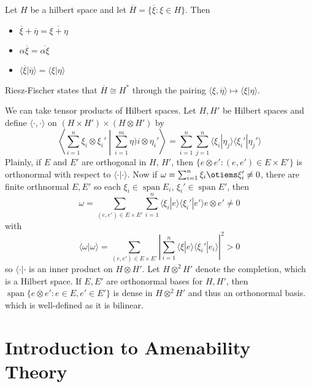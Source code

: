 \documentclass[11pt, a4paper]{memoir}
\newcommand{\ol}[1]{\ensuremath{\overline{#1}}}
\theoremstyle{change}
\theoremstyle{plain}
\theoremstyle{nonumberplain}
\DeclareMathOperator{\spn}{span}
\numberwithin{equation}{section}
\begin{document}
Let $H$ be a hilbert space and let $\overline{H}=\{\overline{\xi}:\xi\in H\}$.
Then
\begin{itemize}[nl]
    \item $\overline{\xi}+\overline{\eta}=\overline{\xi+\eta}$
    \item $\alpha\overline{\xi}=\overline{\alpha\xi}$
    \item $\langle\ol{\xi}|\ol{\eta}\rangle=\langle\xi|\eta\rangle$
\end{itemize}
Riesz-Fischer states that $\overline{H}\cong H^*$ through the pairing $\langle\xi,\overline{\eta}\rangle\mapsto\langle\xi|\eta\rangle$.

We can take tensor products of Hilbert spaces.
Let $H,H'$ be Hilbert spaces and define $\langle\cdot,\cdot\rangle$ on $(H\times H')\times(H\otimes H')$ by
\begin{equation*}
    \left\langle\sum_{i=1}^n\xi_i\otimes\xi_i'\middle|\sum_{i=1}^m\eta)i\otimes\eta_i'\right\rangle=\sum_{i=1}^n\sum_{j=1}^n\langle\xi_i|\eta_j\rangle\langle\xi_i'|\eta_j'\rangle
\end{equation*}
Plainly, if $E$ and $E'$ are orthogonal in $H$, $H'$, then $\{e\otimes e':(e,e')\in E\times E'\}$ is orthonormal with respect to $\langle\cdot|\cdot\rangle$.
Now if $\omega=\sum_{i=1}^n\xi_i\otiems\xi_i'\neq 0$, there are finite orthnormal $E,E'$ so each $\xi_i\in\spn E_i$, $\xi_i'\in\spn E'$, then
\begin{equation*}
    \omega=\sum_{(e,e')\in E\times E'}\sum_{i=1}^n\langle\xi_i|e\rangle\langle\xi_i'|e'\rangle e\otimes e'\neq 0
\end{equation*}
with
\begin{equation*}
    \langle\omega|\omega\rangle=\sum_{(e,e')\in E\times E'}\left\lvert\sum_{i=1}^n\langle\xi|e\rangle\langle\xi_i'|e_i\rangle\right\rvert^2>0
\end{equation*}
so $\langle\cdot|\cdot$ is an inner product on $H\otimes H'$.
Let $H\otimes^2 H'$ denote the completion, which is a Hilbert space.
If $E,E'$ are orthonormal bases for $H,H'$, then $\spn\{e\otimes e':e\in E,e'\in E'\}$ is dense in $H\otimes^2 H'$ and thus an orthonormal basis.
which is well-defined as it is bilinear.
\section{Introduction to Amenability Theory}
\end{document}

